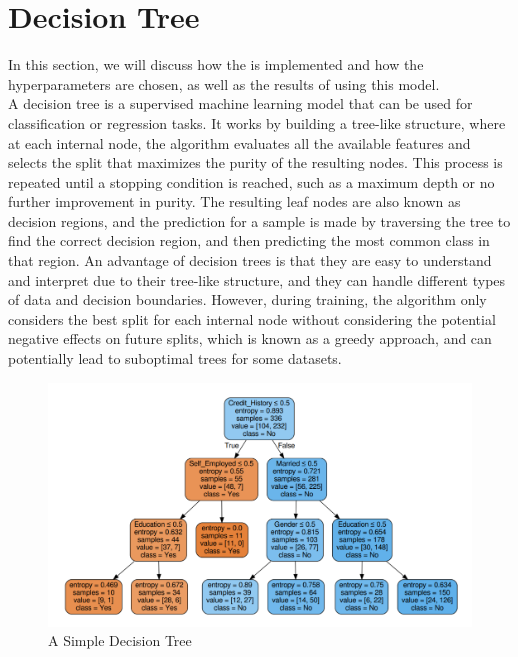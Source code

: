 \section{Decision Tree}
In this section, we will discuss how the  is implemented and how the hyperparameters are chosen, as well as the results of using this model.\\
A decision tree is a supervised machine learning model that can be used for classification or regression tasks.
It works by building a tree-like structure, where at each internal node, the algorithm evaluates all the available features and selects the split that maximizes the purity of the resulting nodes.
This process is repeated until a stopping condition is reached, such as a maximum depth or no further improvement in purity.
The resulting leaf nodes are also known as decision regions, and the prediction for a sample is made by traversing the tree to find the correct decision region, and then predicting the most common class in that region.
An advantage of decision trees is that they are easy to understand and interpret due to their tree-like structure, and they can handle different types of data and decision boundaries.
However, during training, the algorithm only considers the best split for each internal node without considering the potential negative effects on future splits, which is known as a greedy approach, and can potentially lead to suboptimal trees for some datasets.
\cite{introStats}

\begin{figure}[H]
    \centering
    \includegraphics[scale=0.25]{figures_for_report/example_decision_tree}
    \captionsetup{justification=centering,margin=2cm}
    \caption{A Simple Decision Tree}
\end{figure}


